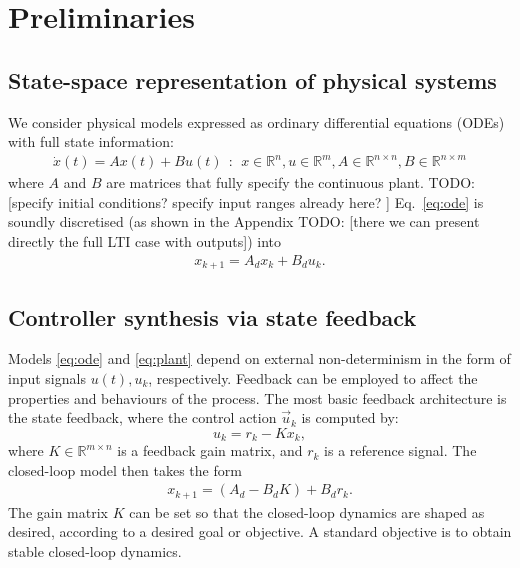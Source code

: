 \documentclass[runningheads,a4paper]{llncs}
\newcommand{\todo}[1]{{\color{red} TODO: #1}}
\begin{document}

\section{Preliminaries}
\label{sec:preliminaries}

\subsection{State-space representation of physical systems} 
\label{ssec:ssrepresentation}

We consider physical models expressed as ordinary differential equations (ODEs) with full state information:  
%
\begin{align}
\label{eq:ode}
\dot{x}(t) = Ax(t)+ B u(t)\ \ :\ \ x \in \mathbb{R}^{n}, u \in \mathbb{R}^m, A \in \mathbb{R}^{n \times n}, B \in \mathbb{R}^{n \times m}
\end{align}
where $A$ and $B$ are matrices that fully specify the continuous plant.  
\todo{[specify initial conditions? specify input ranges already here? ]} 
Eq.~\eqref{eq:ode} is soundly discretised (as shown in the Appendix \todo{[there we can present directly the full LTI case with outputs]}) into
%
\begin{align}
\label{eq:plant}
x_{k+1} = A_d x_k+ B_d u_k. 
\end{align}
%

\subsection{Controller synthesis via state feedback}
\label{ssec:statefeedbackcontrol}

Models \eqref{eq:ode} and \eqref{eq:plant} depend on external non-determinism in the form of input signals $u (t), u_k$, respectively. 
Feedback can be employed to affect the properties and behaviours of the process. 
The most basic feedback architecture is the state feedback, 
where the control action $\vec{u}_k$ is computed by: 
%
\begin{equation}
u_k = r_{k} - K x_k, 
\end{equation}
%
where $K \in \mathbb{R}^{m \times n}$ is a feedback gain matrix, 
and $r_{k}$ is a reference signal.   
%
The closed-loop model then takes the form 
\begin{align}
\label{eq:closedloopss}
x_{k+1} = ( A_d - B_d K ) + B_d r_k.
\end{align}
The gain matrix $K$ can be set so that the closed-loop dynamics are shaped as desired, 
according to a desired goal or objective. 
A standard objective is to obtain stable closed-loop dynamics. 
\end{document}
